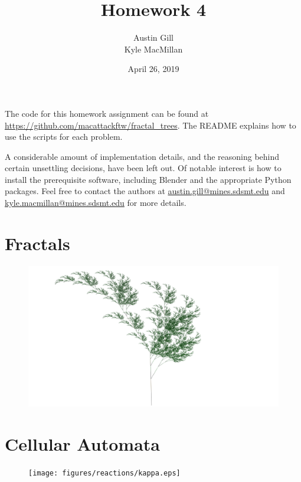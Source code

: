 \documentclass[12pt]{article}
\title{Homework 4}
\author{Austin Gill \\ Kyle MacMillan}
\date{April 26, 2019}
\begin{document}
\maketitle
\begingroup
\hypersetup{linkcolor=black}
\tableofcontents
\endgroup

The code for this homework assignment can be found at \url{https://github.com/macattackftw/fractal_trees}.
The README explains how to use the scripts for each problem.

A considerable amount of implementation details, and the reasoning behind certain unsettling decisions, have been left out.
Of notable interest is how to install the prerequisite software, including Blender and the appropriate Python packages.
Feel free to contact the authors at \href{mailto:austin.gill@mines.sdsmt.edu}{austin.gill@mines.sdsmt.edu} and \href{mailto:kyle.macmillan@mines.sdsmt.edu}{kyle.macmillan@mines.sdsmt.edu} for more details.

\newpage

\part{Fractals}
\vspace{2in}
\begin{figure}[H]
    \centering
    \includegraphics[width=\textwidth]{figures/L-systems/a.png}
\end{figure}




\part{Cellular Automata}
\begin{figure}[H]
    \centering
    \texttt{[image: figures/reactions/kappa.eps]}
\end{figure}


\end{document}
